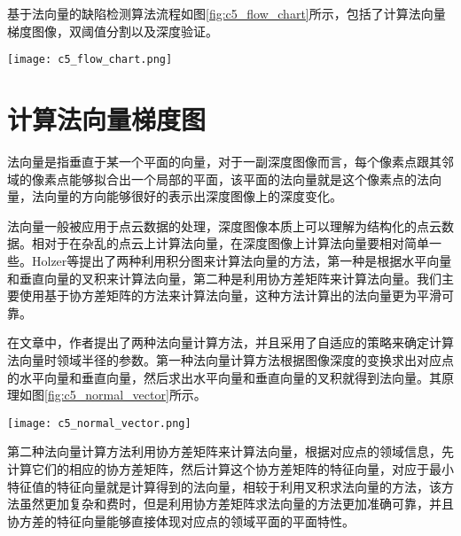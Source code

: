     基于法向量的缺陷检测算法流程如图\ref{fig:c5_flow_chart}所示，包括了计算法向量梯度图像，双阈值分割以及深度验证。

    \begin{figure*}[!h]
    \centering
    \texttt{[image: c5\_flow\_chart.png]}
    \caption{基于法向量的缺陷检测算法流程图}
    \label{fig:c5_flow_chart}
    \end{figure*}

    \section{计算法向量梯度图}
    法向量是指垂直于某一个平面的向量，对于一副深度图像而言，每个像素点跟其邻域的像素点能够拟合出一个局部的平面，该平面的法向量就是这个像素点的法向量，法向量的方向能够很好的表示出深度图像上的深度变化。

    法向量一般被应用于点云数据的处理，深度图像本质上可以理解为结构化的点云数据。相对于在杂乱的点云上计算法向量，在深度图像上计算法向量要相对简单一些。Holzer等\cite{Holzer2012Adaptive}提出了两种利用积分图来计算法向量的方法，第一种是根据水平向量和垂直向量的叉积来计算法向量，第二种是利用协方差矩阵来计算法向量。我们主要使用基于协方差矩阵的方法来计算法向量，这种方法计算出的法向量更为平滑可靠。

    在文章\cite{Holzer2012Adaptive}中，作者提出了两种法向量计算方法，并且采用了自适应的策略来确定计算法向量时领域半径的参数。第一种法向量计算方法根据图像深度的变换求出对应点的水平向量和垂直向量，然后求出水平向量和垂直向量的叉积就得到法向量。其原理如图\ref{fig:c5_normal_vector}所示。

    \begin{figure*}[!h]
    \centering
    \texttt{[image: c5\_normal\_vector.png]}
    \caption{法向量计算原理}
    \label{fig:c5_normal_vector}
    \end{figure*}

    第二种法向量计算方法利用协方差矩阵来计算法向量，根据对应点的领域信息，先计算它们的相应的协方差矩阵，然后计算这个协方差矩阵的特征向量，对应于最小特征值的特征向量就是计算得到的法向量，相较于利用叉积求法向量的方法，该方法虽然更加复杂和费时，但是利用协方差矩阵求法向量的方法更加准确可靠，并且协方差的特征向量能够直接体现对应点的领域平面的平面特性。

